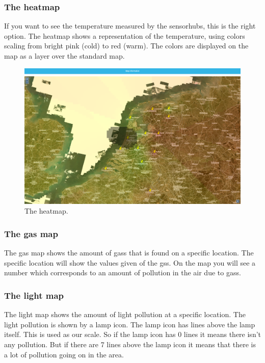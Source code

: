 \documentclass[a4paper]{article}
\begin{document}
\subsubsection{The heatmap}
If you want to see the temperature measured by the sensorhubs, this is the right option.
The heatmap shows a representation of the temperature, using colors scaling from bright pink (cold) to red (warm). The colors are displayed on the map as a layer over the standard map.\begin{figure}[h!]
  \caption{The heatmap.}
  \centering
  \includegraphics[width=1\textwidth]{heatmap}
\end{figure}
\newline
\subsubsection{The gas map} 
The gas map shows the amount of gass that is found on a specific location. The specific location will show the values given of the gss. On the map you will see a number which corresponds to an amount of pollution in the air due to gass.  

\subsubsection{The light map}
The light map shows the amount of light pollution at a specific location. The light pollution is shown by a lamp icon. The lamp icon has lines above the lamp itself. This is used as our scale. So if the lamp icon has 0 lines it means there isn't any pollution. But if there are 7 lines above the lamp icon it means that there is a lot of pollution going on in the area.

\newpage
\end{document}

